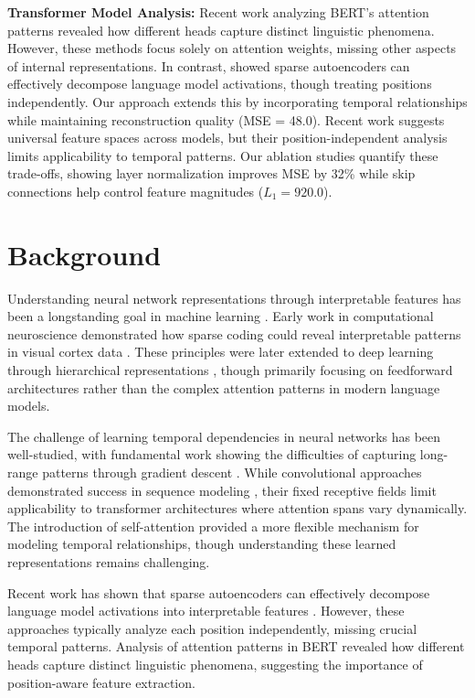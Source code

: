 \documentclass{article} %
\begin{document}
\textbf{Transformer Model Analysis:} Recent work analyzing BERT's attention patterns \cite{Clark2019WhatDB} revealed how different heads capture distinct linguistic phenomena. However, these methods focus solely on attention weights, missing other aspects of internal representations. In contrast, \cite{Cunningham2023SparseAF} showed sparse autoencoders can effectively decompose language model activations, though treating positions independently. Our approach extends this by incorporating temporal relationships while maintaining reconstruction quality (MSE = 48.0). Recent work \cite{Lan2024SparseAR} suggests universal feature spaces across models, but their position-independent analysis limits applicability to temporal patterns. Our ablation studies quantify these trade-offs, showing layer normalization improves MSE by 32\% while skip connections help control feature magnitudes ($L_1 = 920.0$).


\section{Background}
\label{sec:background}

Understanding neural network representations through interpretable features has been a longstanding goal in machine learning \cite{Olshausen1996EmergenceOS}. Early work in computational neuroscience demonstrated how sparse coding could reveal interpretable patterns in visual cortex data \cite{Olshausen1996LearningEL}. These principles were later extended to deep learning through hierarchical representations \cite{Bengio2007LearningDA}, though primarily focusing on feedforward architectures rather than the complex attention patterns in modern language models.

The challenge of learning temporal dependencies in neural networks has been well-studied, with fundamental work showing the difficulties of capturing long-range patterns through gradient descent \cite{Bengio1994LearningLD}. While convolutional approaches demonstrated success in sequence modeling \cite{Bai2018AnEE}, their fixed receptive fields limit applicability to transformer architectures where attention spans vary dynamically. The introduction of self-attention \cite{vaswani2017attention} provided a more flexible mechanism for modeling temporal relationships, though understanding these learned representations remains challenging.

Recent work has shown that sparse autoencoders can effectively decompose language model activations into interpretable features \cite{Cunningham2023SparseAF}. However, these approaches typically analyze each position independently, missing crucial temporal patterns. Analysis of attention patterns in BERT \cite{Clark2019WhatDB} revealed how different heads capture distinct linguistic phenomena, suggesting the importance of position-aware feature extraction.
\end{document}
